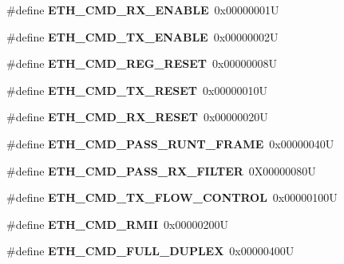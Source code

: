 \begin{DoxyCompactItemize}
\#define {\bfseries E\+T\+H\+\_\+\+C\+M\+D\+\_\+\+R\+X\+\_\+\+E\+N\+A\+B\+LE}~0x00000001U
\item 
\mbox{\label{lpc-ethernet_8c_aebb803511f8bfea1082fc0ab24975b7a}} 
\#define {\bfseries E\+T\+H\+\_\+\+C\+M\+D\+\_\+\+T\+X\+\_\+\+E\+N\+A\+B\+LE}~0x00000002U
\item 
\mbox{\label{lpc-ethernet_8c_ad62a0479c167fe900515f232df16a137}} 
\#define {\bfseries E\+T\+H\+\_\+\+C\+M\+D\+\_\+\+R\+E\+G\+\_\+\+R\+E\+S\+ET}~0x00000008U
\item 
\mbox{\label{lpc-ethernet_8c_a7bbc3087e255bb936b3e68081524de68}} 
\#define {\bfseries E\+T\+H\+\_\+\+C\+M\+D\+\_\+\+T\+X\+\_\+\+R\+E\+S\+ET}~0x00000010U
\item 
\mbox{\label{lpc-ethernet_8c_a34147e58c4ccd52937a251512e8580f4}} 
\#define {\bfseries E\+T\+H\+\_\+\+C\+M\+D\+\_\+\+R\+X\+\_\+\+R\+E\+S\+ET}~0x00000020U
\item 
\mbox{\label{lpc-ethernet_8c_a9c932c4b2332b2d9f121cc82a09ecbdc}} 
\#define {\bfseries E\+T\+H\+\_\+\+C\+M\+D\+\_\+\+P\+A\+S\+S\+\_\+\+R\+U\+N\+T\+\_\+\+F\+R\+A\+ME}~0x00000040U
\item 
\mbox{\label{lpc-ethernet_8c_a78f591c06119bc24239199fdbe0bb4dc}} 
\#define {\bfseries E\+T\+H\+\_\+\+C\+M\+D\+\_\+\+P\+A\+S\+S\+\_\+\+R\+X\+\_\+\+F\+I\+L\+T\+ER}~0\+X00000080U
\item 
\mbox{\label{lpc-ethernet_8c_a48a5a8a0549814d6810c6f5eb1be4eea}} 
\#define {\bfseries E\+T\+H\+\_\+\+C\+M\+D\+\_\+\+T\+X\+\_\+\+F\+L\+O\+W\+\_\+\+C\+O\+N\+T\+R\+OL}~0x00000100U
\item 
\mbox{\label{lpc-ethernet_8c_a5273f77a1f884be130100820a850f779}} 
\#define {\bfseries E\+T\+H\+\_\+\+C\+M\+D\+\_\+\+R\+M\+II}~0x00000200U
\item 
\mbox{\label{lpc-ethernet_8c_ab918cd69810baa452a7e079c7ff9bc28}} 
\#define {\bfseries E\+T\+H\+\_\+\+C\+M\+D\+\_\+\+F\+U\+L\+L\+\_\+\+D\+U\+P\+L\+EX}~0x00000400U
\item 
\mbox{\label{lpc-ethernet_8c_a4e3898d2f25cbdc0579eed5fd9f2f416}} 

\end{DoxyCompactItemize}
